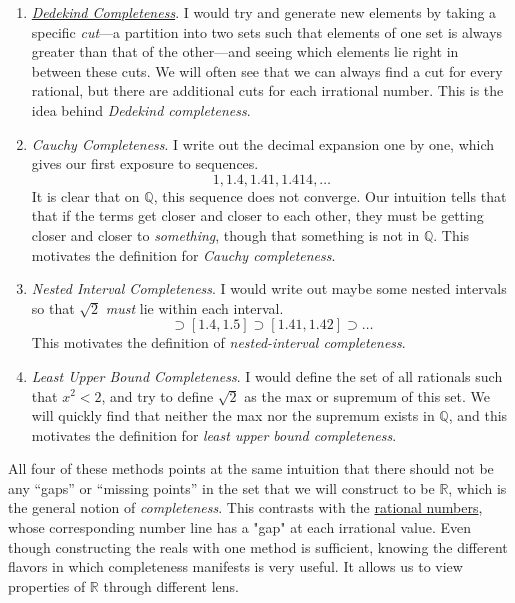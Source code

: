   \begin{enumerate}
    \item \textit{\hyperref[alg-def:dedekind-completeness]{Dedekind Completeness}}. I would try and generate new elements by taking a specific \textit{cut}---a partition into two sets such that elements of one set is always greater than that of the other---and seeing which elements lie right in between these cuts. We will often see that we can always find a cut for every rational, but there are additional cuts for each irrational number. This is the idea behind \textit{Dedekind completeness}. 

    \item \textit{Cauchy Completeness}. I write out the decimal expansion one by one, which gives our first exposure to sequences. 
    \begin{equation}
      1, 1.4, 1.41, 1.414, \ldots
    \end{equation} 
    It is clear that on $\mathbb{Q}$, this sequence does not converge. Our intuition tells that that if the terms get closer and closer to each other, they must be getting closer and closer to \textit{something}, though that something is not in $\mathbb{Q}$. This motivates the definition for \textit{Cauchy completeness}. 

    \item \textit{Nested Interval Completeness}. I would write out maybe some nested intervals so that $\sqrt{2}$ \textit{must} lie within each interval. 
    \begin{equation}
      [1, 2] \supset [1.4, 1.5] \supset [1.41, 1.42] \supset \ldots 
    \end{equation}
    This motivates the definition of \textit{nested-interval completeness}. 

    \item \textit{Least Upper Bound Completeness}. I would define the set of all rationals such that $x^2 < 2$, and try to define $\sqrt{2}$ as the max or supremum of this set. We will quickly find that neither the max nor the supremum exists in $\mathbb{Q}$, and this motivates the definition for \textit{least upper bound completeness}. 
  \end{enumerate}

  All four of these methods points at the same intuition that there should not be any ``gaps'' or ``missing points'' in the set that we will construct to be $\mathbb{R}$, which is the general notion of \textit{completeness}. This contrasts with the \hyperref[alg-def:rational-numbers]{rational numbers}, whose corresponding number line has a "gap" at each irrational value. Even though constructing the reals with one method is sufficient, knowing the different flavors in which completeness manifests is very useful. It allows us to view properties of $\mathbb{R}$ through different lens. 

